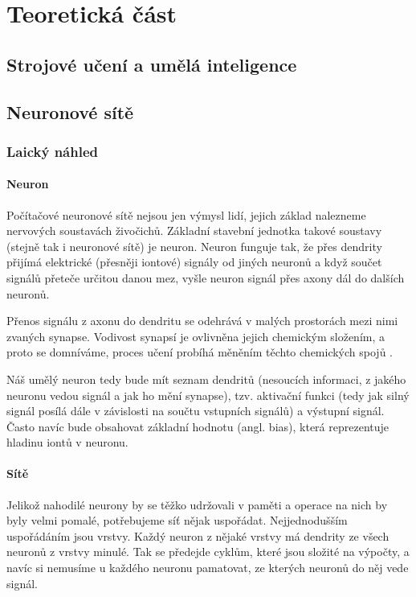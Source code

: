 \documentclass[12pt]{report}			%
\begin{document}
	
	\part{Teoretická část}
		
		\chapter{Strojové učení a umělá inteligence}
		
		\chapter{Neuronové sítě}
		
			\section{Laický náhled}
			
				\subsection{Neuron}
					Počítačové neuronové sítě nejsou jen výmysl lidí, jejich základ nalezneme nervových soustavách živočichů. Základní stavební jednotka takové soustavy (stejně tak i neuronové sítě) je neuron. Neuron funguje tak, že přes \gls{dendrit}y přijímá elektrické (přesněji iontové) signály od jiných neuronů a když součet signálů přeteče určitou danou mez, vyšle neuron signál přes \gls{axon}y dál do dalších neuronů.
					
					Přenos signálu z \gls{axon}u do \gls{dendrit}u se odehrává v malých prostorách mezi nimi zvaných \gls{synapse}. Vodivost synapsí je ovlivněna jejich chemickým složením, a proto se domníváme, proces učení probíhá měněním těchto chemických spojů \autocite[s. 491]{Book:Informatika}.
					
					Náš umělý neuron tedy bude mít seznam \gls{dendrit}ů (nesoucích informaci, z jakého neuronu vedou signál a jak ho mění \gls{synapse}), tzv. aktivační funkci (tedy jak silný signál posílá dále v závislosti na součtu vstupních signálů) a výstupní signál. Často navíc bude obsahovat základní hodnotu (angl. bias), která reprezentuje hladinu iontů v neuronu.
				
				\subsection{Sítě}
					Jelikož nahodilé neurony by se těžko udržovali v paměti a operace na nich by byly velmi pomalé, potřebujeme síť nějak uspořádat. Nejjednodušším uspořádáním jsou vrstvy. Každý neuron z nějaké vrstvy má \gls{dendrit}y ze všech neuronů z vrstvy minulé. Tak se předejde cyklům, které jsou složité na výpočty, a navíc si nemusíme u každého neuronu pamatovat, ze kterých neuronů do něj vede signál.
					
\end{document}
